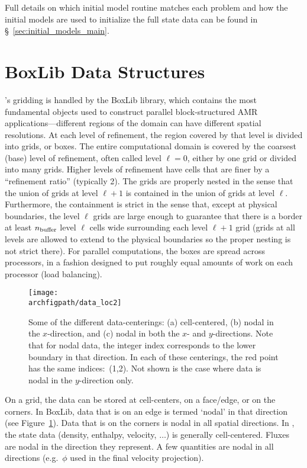 Full details on which initial model routine matches each problem and
how the initial models are used to initialize the full state data can
be found in \S~\ref{sec:initial_models_main}.



\section{BoxLib Data Structures}

\maestro's gridding is handled by the BoxLib library, which
contains the most fundamental objects used to construct parallel
block-structured AMR applications---different
regions of the domain can have different spatial resolutions.
At each level of refinement, the region covered by that level is divided
into grids, or boxes.  The entire computational domain is covered by
the coarsest (base) level of refinement, often called level $\ell=0$, either by one
grid or divided into many grids.
Higher levels of refinement have cells that are finer by a ``refinement ratio''
(typically 2).  The grids are properly nested in the sense that the union 
of grids at level $\ell+1$ is contained in the union of grids at level $\ell$.
Furthermore, the containment is strict in the sense that, except at physical 
boundaries, the level $\ell$ grids are large enough to guarantee that there is
a border at least $n_{\rm buffer}$ level $\ell$ cells wide surrounding each level
$\ell +1$ grid (grids at all levels are allowed to extend to the physical
boundaries so the proper nesting is not strict there).  
For parallel computations, the boxes are spread across processors, in
a fashion designed to put roughly equal amounts of work on each
processor (load balancing).

\begin{figure}[t]
\centering
\texttt{[image: \\archfigpath/data\_loc2]}
\caption[Data-centerings on the grid]
  {\label{fig:dataloc} Some of the different data-centerings:
  (a) cell-centered, (b) nodal in the $x$-direction, and (c) nodal in
  both the $x$- and $y$-directions.  Note that for nodal data, the
  integer index corresponds to the lower boundary in that direction.
  In each of these centerings, the red point has the same indices:\ (1,2).
  Not shown is the case where data is nodal in the $y$-direction only.}
\end{figure}
On a grid, the data can be stored at cell-centers, on a face/edge, or
on the corners.  In BoxLib, data that is on an edge is termed `nodal'
in that direction (see Figure~\ref{fig:dataloc}).  Data that is on the
corners is nodal in all spatial directions.  In \maestro, the state
data (density, enthalpy, velocity, $\ldots$) is generally
cell-centered.  Fluxes are nodal in the direction they represent.
A few quantities are nodal in all directions (e.g.\ $\phi$ used in
the final velocity projection).

